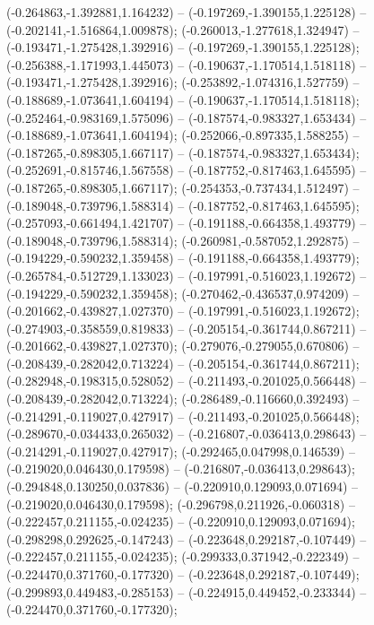 (-0.264863,-1.392881,1.164232) -- (-0.197269,-1.390155,1.225128) -- (-0.202141,-1.516864,1.009878);
 (-0.260013,-1.277618,1.324947) -- (-0.193471,-1.275428,1.392916) -- (-0.197269,-1.390155,1.225128);
 (-0.256388,-1.171993,1.445073) -- (-0.190637,-1.170514,1.518118) -- (-0.193471,-1.275428,1.392916);
 (-0.253892,-1.074316,1.527759) -- (-0.188689,-1.073641,1.604194) -- (-0.190637,-1.170514,1.518118);
 (-0.252464,-0.983169,1.575096) -- (-0.187574,-0.983327,1.653434) -- (-0.188689,-1.073641,1.604194);
 (-0.252066,-0.897335,1.588255) -- (-0.187265,-0.898305,1.667117) -- (-0.187574,-0.983327,1.653434);
 (-0.252691,-0.815746,1.567558) -- (-0.187752,-0.817463,1.645595) -- (-0.187265,-0.898305,1.667117);
 (-0.254353,-0.737434,1.512497) -- (-0.189048,-0.739796,1.588314) -- (-0.187752,-0.817463,1.645595);
 (-0.257093,-0.661494,1.421707) -- (-0.191188,-0.664358,1.493779) -- (-0.189048,-0.739796,1.588314);
 (-0.260981,-0.587052,1.292875) -- (-0.194229,-0.590232,1.359458) -- (-0.191188,-0.664358,1.493779);
 (-0.265784,-0.512729,1.133023) -- (-0.197991,-0.516023,1.192672) -- (-0.194229,-0.590232,1.359458);
 (-0.270462,-0.436537,0.974209) -- (-0.201662,-0.439827,1.027370) -- (-0.197991,-0.516023,1.192672);
 (-0.274903,-0.358559,0.819833) -- (-0.205154,-0.361744,0.867211) -- (-0.201662,-0.439827,1.027370);
 (-0.279076,-0.279055,0.670806) -- (-0.208439,-0.282042,0.713224) -- (-0.205154,-0.361744,0.867211);
 (-0.282948,-0.198315,0.528052) -- (-0.211493,-0.201025,0.566448) -- (-0.208439,-0.282042,0.713224);
 (-0.286489,-0.116660,0.392493) -- (-0.214291,-0.119027,0.427917) -- (-0.211493,-0.201025,0.566448);
 (-0.289670,-0.034433,0.265032) -- (-0.216807,-0.036413,0.298643) -- (-0.214291,-0.119027,0.427917);
 (-0.292465,0.047998,0.146539) -- (-0.219020,0.046430,0.179598) -- (-0.216807,-0.036413,0.298643);
 (-0.294848,0.130250,0.037836) -- (-0.220910,0.129093,0.071694) -- (-0.219020,0.046430,0.179598);
 (-0.296798,0.211926,-0.060318) -- (-0.222457,0.211155,-0.024235) -- (-0.220910,0.129093,0.071694);
 (-0.298298,0.292625,-0.147243) -- (-0.223648,0.292187,-0.107449) -- (-0.222457,0.211155,-0.024235);
 (-0.299333,0.371942,-0.222349) -- (-0.224470,0.371760,-0.177320) -- (-0.223648,0.292187,-0.107449);
 (-0.299893,0.449483,-0.285153) -- (-0.224915,0.449452,-0.233344) -- (-0.224470,0.371760,-0.177320);
